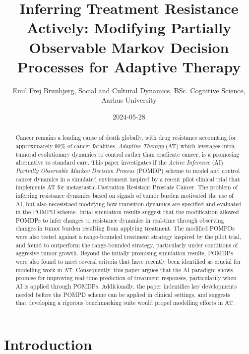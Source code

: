 \documentclass[
]{article}
\title{Inferring Treatment Resistance Actively: Modifying Partially
Observable Markov Decision Processes for Adaptive Therapy}
\author{Emil Frej Brunbjerg, \n Social and Cultural Dynamics, BSc.
Cognitive Science, Aarhus University}
\date{2024-05-28}
\begin{document}
\maketitle
\begin{abstract}
\doublespacing Cancer remains a leading cause of death globally, with
drug resistance accounting for approximately 90\% of cancer fatalities.
\emph{Adaptive Therapy} (AT) which leverages intra-tumoral evolutionary
dynamics to control rather than eradicate cancer, is a promosing
alternative to standard care. This paper investigates if the
\emph{Active Inference} (AI) \emph{Partially Observable Markov Decision
Process} (POMDP) scheme to model and control cancer dynamics in a
simulated enviroment inspired by a recent pilot clinical trial that
implements AT for metastastic-Castration Resistant Prostate Cancer. The
problem of inferring resistance dynamics based on signals of tumor
burden motivated the use of AI, but also necesistaed modifying how
transition dynamics are specified and evaluated in the POMPD scheme.
Intial simulation results suggest that the modification allowed POMDPs
to infer changes to resistance dynamics in real-time through observing
changes in tumor burden resulting from applying treatment. The modified
POMPDs were also tested against a range-bounded treatment strategy
inspired by the pilot trial, and found to outperform the range-bounded
strategy, particularly under conditions of aggresive tumor growth.
Beyond the intially promising simulation results, POMDPs were also found
to meet several criteria that have recently been identified as crucial
for modelling work in AT. Consequently, this paper argues that the AI
paradigm shows promise for improving real-time prediction of treatment
responses, particularily when AI is applied through POMDPs.
Additionally, the paper indentifies key developments needed before the
POMPD scheme can be applied in clinical settings, and suggests that
developing a rigorous benchmarking suite would propel modelling efforts
in AT. \clearpage
\end{abstract}

{
\setcounter{tocdepth}{3}
\tableofcontents
}

\captionsetup[figure]{font=scriptsize}

\pagebreak

\section{Introduction}\label{introduction}
\end{document}
